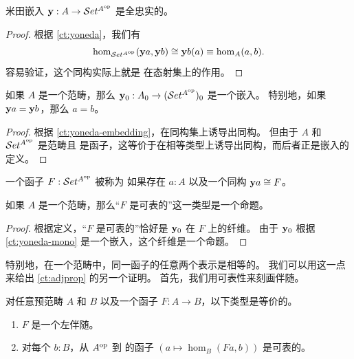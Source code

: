 \begin{cor}\label{ct:yoneda-embedding}
  米田嵌入 $\mathbf{y} :A\to \mathcal{S}et^{A^{\mathrm{op}}}$ 是全忠实的。
\end{cor}

\begin{proof}
  根据 \cref{ct:yoneda}，我们有
  \[ \hom_{\mathcal{S}et^{A^{\mathrm{op}}}}(\mathbf{y} a, \mathbf{y} b) \cong \mathbf{y} b(a) \equiv \hom_A(a,b). \]
  容易验证，这个同构实际上就是 \y 在态射集上的作用。
\end{proof}

\begin{cor}\label{ct:yoneda-mono}
  如果 $A$ 是一个范畴，那么 $\mathbf{y}_0 : A_0 \to (\mathcal{S}et^{A^{\mathrm{op}}})_0$ 是一个嵌入。
  特别地，如果 $\mathbf{y} a = \mathbf{y} b$，那么 $a=b$。
\end{cor}

\begin{proof}
  根据 \cref{ct:yoneda-embedding}，\y 在同构集上诱导出同构。
  但由于 $A$ 和 $\mathcal{S}et^{A^{\mathrm{op}}}$ 是范畴且 \y 是函子，这等价于在相等类型上诱导出同构，而后者正是嵌入的定义。
\end{proof}

\begin{defn}\label{ct:representable}
  一个函子 $F:\mathcal{S}et^{A^{\mathrm{op}}}$ 被称为 
  如果存在 $a:A$ 以及一个同构 $\mathbf{y} a \cong F$。
\end{defn}

\begin{thm}\label{ct:representable-prop}
  如果 $A$ 是一个范畴，那么``$F$ 是可表的''这一类型是一个命题。
\end{thm}

\begin{proof}
  根据定义，``$F$ 是可表的''恰好是 $\mathbf{y}_0$ 在 $F$ 上的纤维。
  由于 $\mathbf{y}_0$ 根据 \cref{ct:yoneda-mono} 是一个嵌入，这个纤维是一个命题。
\end{proof}

特别地，在一个范畴中，同一函子的任意两个表示是相等的。
我们可以用这一点来给出 \cref{ct:adjprop} 的另一个证明。
首先，我们用可表性来刻画伴随。

\begin{lem}\label{ct:adj-repr}
  对任意预范畴 $A$ 和 $B$ 以及一个函子 $F:A\to B$，以下类型是等价的。
  \begin{enumerate}
  \item $F$ 是一个左伴随。\label{item:ct:ar1}
  \item 对每个 $b:B$，从 $A^{\mathrm{op}}$ 到 \uset 的函子 $(a \mapsto \hom_B(Fa,b))$ 是可表的。\label{item:ct:ar2}
  \end{enumerate}
\end{lem}

